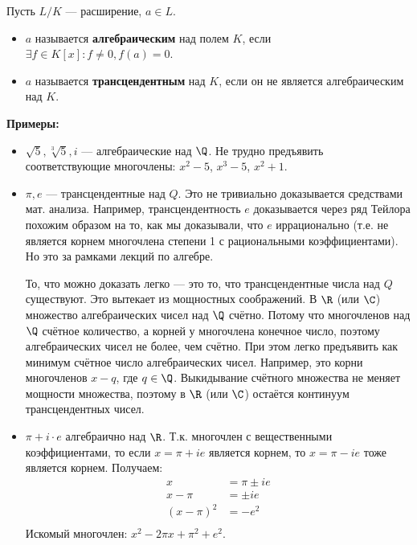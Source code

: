 \begin{conj}
    Пусть $L / K$ --- расширение, $a \in L$. 
    \begin{itemize}
        \item $a$ называется \textbf{алгебраическим} над полем $K$, если $\exists f \in K[x] : f \neq 0, f(a) = 0$. 
        \item $a$ называется \textbf{трансцендентным} над $K$, если он не является алгебраическим над $K$.
    \end{itemize} 
\end{conj}

\textbf{Примеры:} 
\begin{itemize}
    \item $\sqrt{5}, \sqrt[3]{5}, i$ --- алгебраические над $\Q$. Не трудно предъявить соответствующие многочлены: $x^2 - 5$, $x^3 - 5$, $x^2 + 1$.
    \item $\pi, e$ --- трансцендентные над $Q$. Это не тривиально доказывается средствами мат. анализа. Например, трансцендентность $e$ доказывается через ряд Тейлора похожим образом на то, как мы доказывали, что $e$ иррационально (т.е. не является корнем многочлена степени 1 с рациональными коэффициентами). Но это за рамками лекций по алгебре. 
    
    То, что можно доказать легко --- это то, что трансцендентные числа над $Q$ существуют. Это вытекает из мощностных соображений. В $\R$ (или $\C$) множество алгебраических чисел над $\Q$ счётно. Потому что многочленов над $\Q$ счётное количество, а корней у многочлена конечное число, поэтому алгебраических чисел не более, чем счётно. При этом легко предъявить как минимум счётное число алгебраических чисел. Например, это корни многочленов $x - q$, где $q \in \Q$. Выкидывание счётного множества не меняет мощности множества, поэтому в $\R$ (или $\C$) остаётся континуум трансцендентных чисел. 

    \item $\pi + i \cdot e$ алгебраично над $\R$. Т.к. многочлен с вещественными коэффициентами, то если $x = \pi + i e$ является корнем, то $x = \pi - i e$ тоже является корнем. Получаем: 
    \begin{align*}
        x &= \pi \pm ie \\
        x - \pi &= \pm ie \\
        (x - \pi)^2 &= -e^2 \\
    \end{align*}
    Искомый многочлен: $x^2 - 2\pi x + \pi^2 + e^2$. 
\end{itemize}

